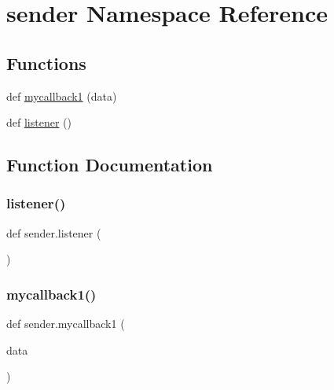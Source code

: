 \hypertarget{namespacesender}{}\section{sender Namespace Reference}
\label{namespacesender}
\subsection*{Functions}
\begin{DoxyCompactItemize}
\item 
def \hyperlink{namespacesender_a395e7bae8fd61526670d999891ecf5fd}{mycallback1} (data)
\item 
def \hyperlink{namespacesender_a144bddc369cab38dc0793208e8928046}{listener} ()
\end{DoxyCompactItemize}


\subsection{Function Documentation}
\mbox{\label{namespacesender_a144bddc369cab38dc0793208e8928046}} 
\subsubsection{\texorpdfstring{listener()}{listener()}}
{\footnotesize\ttfamily def sender.\+listener (\begin{DoxyParamCaption}{ }\end{DoxyParamCaption})}

\mbox{\label{namespacesender_a395e7bae8fd61526670d999891ecf5fd}} 
\subsubsection{\texorpdfstring{mycallback1()}{mycallback1()}}
{\footnotesize\ttfamily def sender.\+mycallback1 (\begin{DoxyParamCaption}\item[{}]{data }\end{DoxyParamCaption})}


